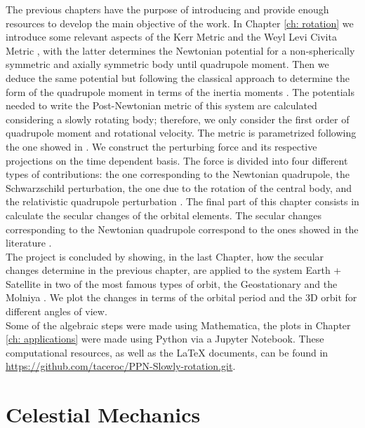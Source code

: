 The previous chapters have the purpose of introducing and provide enough resources to develop the main objective of the work. In Chapter \ref{ch: rotation} we introduce some relevant aspects of the Kerr Metric \cite{Bambi, Frolov, Raine} and the Weyl Levi Civita Metric \cite{johnandcoulter}, with the latter determines the Newtonian potential for a non-spherically symmetric and axially symmetric body until quadrupole moment. Then we deduce the same potential but following the classical approach to determine the form of the quadrupole moment in terms of the inertia moments \cite{Goldstain, GravityPoisson}. The potentials needed to write the Post-Newtonian metric of this system are calculated considering a slowly rotating body; therefore, we only consider the first order of quadrupole moment and rotational velocity. The metric is parametrized following the one showed in \cite{Brumberg}. We construct the perturbing force and its respective projections on the time dependent basis. The force is divided into four different types of contributions: the one corresponding to the Newtonian quadrupole, the Schwarzschild perturbation, the one due to the rotation of the central body, and the relativistic quadrupole perturbation \cite{Brumberg}. The final part of this chapter consists in calculate the secular changes of the orbital elements. The secular changes corresponding to the Newtonian quadrupole correspond to the ones showed in the literature \cite{Sergeiclassical}.\\

The project is concluded by showing, in the last Chapter, how  the secular changes determine in the previous chapter, are applied to the system Earth + Satellite in two of the most famous types of orbit, the Geostationary and the Molniya \cite{Sergeiclassical, satellitehandbook}. We plot the changes in terms of the orbital period and the 3D orbit for different angles of view.\\

Some of the algebraic steps were made using Mathematica, the plots in Chapter \ref{ch: applications} were made using Python via a Jupyter Notebook. These computational resources, as well as the \LaTeX  \hspace{0.2cm} documents, can be found in \url{https://github.com/taceroc/PPN-Slowly-rotation.git}.




\chapter{Celestial Mechanics}\label{ch: celestial mechanics}

